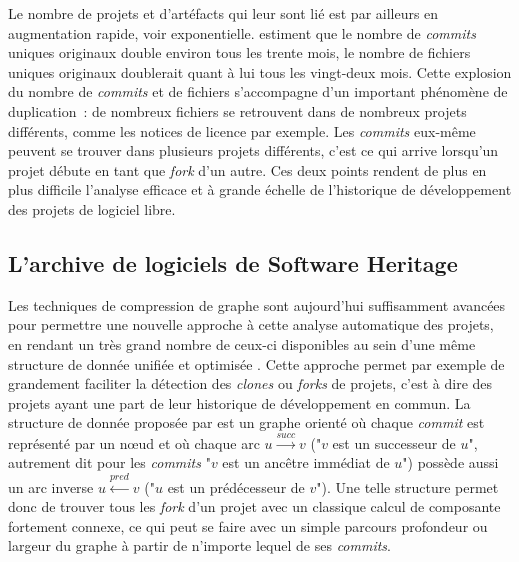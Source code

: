 \documentclass[dvipsnames,runningheads]{llncs}
\newcommand{\en}[1]{\foreignlanguage{english}{\emph{#1}}}
\begin{document}
    Le nombre de projets et d'artéfacts qui leur sont lié est par ailleurs en augmentation rapide, voir
    exponentielle. \textcite{swh-growth-2019} estiment que le nombre de \en{commits} uniques originaux double
    environ tous les trente mois, le nombre de fichiers uniques originaux doublerait quant à lui tous les
    vingt-deux mois. Cette explosion du nombre de \en{commits} et de fichiers s'accompagne d'un important
    phénomène de duplication : de nombreux fichiers se retrouvent dans de nombreux projets différents, comme
    les notices de licence par exemple. Les \en{commits} eux-même peuvent se trouver dans plusieurs projets
    différents, c'est ce qui arrive lorsqu'un projet débute en tant que \en{fork} d'un autre. Ces deux points
    rendent de plus en plus difficile l'analyse efficace et à grande échelle de l'historique de développement
    des projets de logiciel libre.

    \subsection{L'archive de logiciels de Software Heritage}

    \label{ssec:swh-graph}

    Les techniques de compression de graphe sont aujourd'hui suffisamment avancées pour permettre une nouvelle
    approche à cette analyse automatique des projets, en rendant un très grand nombre de ceux-ci disponibles
    au sein d'une même structure de donnée unifiée et optimisée \parencite{swh-graph-2020}. Cette approche
    permet par exemple de grandement faciliter la détection des \en{clones} ou \en{forks} de projets, c'est à
    dire des projets ayant une part de leur historique de développement en commun. La structure de donnée
    proposée par \textcite{swh-graph-2020} est un graphe orienté où chaque \en{commit} est représenté par un
    nœud et où chaque arc $u \xrightarrow{succ} v$ ("$v$ est un successeur de $u$", autrement dit pour les
    \en{commits} "$v$ est un ancêtre immédiat de $u$") possède aussi un arc inverse $u \xleftarrow{pred} v$
    ("$u$ est un prédécesseur de $v$"). Une telle structure permet donc de trouver tous les \en{fork} d'un
    projet avec un classique calcul de composante fortement connexe, ce qui peut se faire avec un simple
    parcours profondeur ou largeur du graphe à partir de n'importe lequel de ses \en{commits}.
\end{document}
